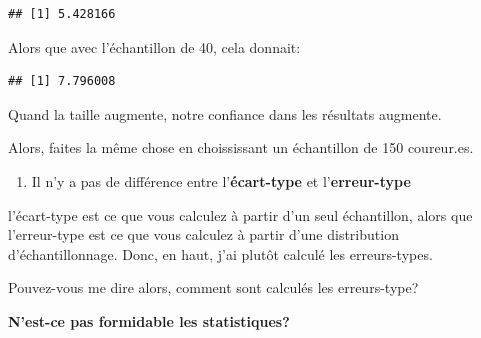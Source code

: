 \documentclass[
]{article}
\newenvironment{Shaded}{\begin{snugshade}}{\end{snugshade}}
\newcommand{\FunctionTok}[1]{\textcolor[rgb]{0.00,0.00,0.00}{#1}}
\newcommand{\NormalTok}[1]{#1}
\newcommand{\SpecialCharTok}[1]{\textcolor[rgb]{0.00,0.00,0.00}{#1}}
\providecommand{\tightlist}{%
  \setlength{\itemsep}{0pt}\setlength{\parskip}{0pt}}
\begin{document}
\begin{verbatim}
## [1] 5.428166
\end{verbatim}

Alors que avec l'échantillon de 40, cela donnait:

\begin{Shaded}
\end{Shaded}

\begin{verbatim}
## [1] 7.796008
\end{verbatim}

Quand la taille augmente, notre confiance dans les résultats augmente.

Alors, faites la même chose en choississant un échantillon de 150
coureur.es.

\begin{enumerate}
\def\labelenumi{\arabic{enumi}.}
\setcounter{enumi}{6}
\tightlist
\item
  Il n'y a pas de différence entre l'\textbf{écart-type} et
  l'\textbf{erreur-type}
\end{enumerate}

l'écart-type est ce que vous calculez à partir d'un seul échantillon,
alors que l'erreur-type est ce que vous calculez à partir d'une
distribution d'échantillonnage. Donc, en haut, j'ai plutôt calculé les
erreurs-types.

Pouvez-vous me dire alors, comment sont calculés les erreurs-type?

\textbf{N'est-ce pas formidable les statistiques?}
\end{document}
